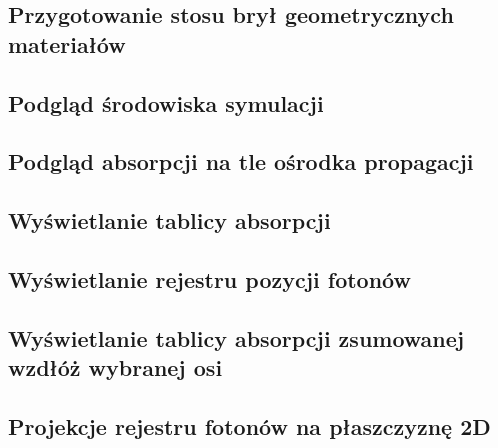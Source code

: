 \subsection{Przygotowanie stosu brył geometrycznych materiałów}
\subsection{Podgląd środowiska symulacji}
\subsection{Podgląd absorpcji na tle ośrodka propagacji}
\subsection{Wyświetlanie tablicy absorpcji}
\subsection{Wyświetlanie rejestru pozycji fotonów}
\subsection{Wyświetlanie tablicy absorpcji zsumowanej wzdłóż wybranej osi}
\subsection{Projekcje rejestru fotonów na płaszczyznę 2D}
